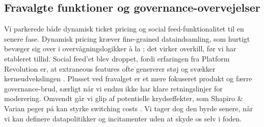 \subsection*{Fravalgte funktioner og governance-overvejelser}
Vi parkerede både dynamisk ticket pricing og social feed-funktionalitet til en senere fase. Dynamisk pricing kræver fine-grained dataindsamling, som hurtigt bevæger sig over i overvågningslogikker \`a la \citet{Zuboff2019}; det virker overkill, før vi har etableret tillid. Social feed'et blev droppet, fordi erfaringen fra Platform Revolution er, at extraneous features ofte genererer støj og svækker kerneudvekslingen \citep{Choudary2016}. Plusset ved fravalget er et mere fokuseret produkt og færre governance-brud, særligt når vi endnu ikke har klare retningslinjer for moderering. Omvendt går vi glip af potentielle krydseffekter, som Shapiro \& Varian peger på kan styrke switching costs \citep{ShapiroVarian1999}. Vi tager dog den byrde senere, når vi kan definere datapolitikker og incitamenter uden at skyde os selv i foden.
